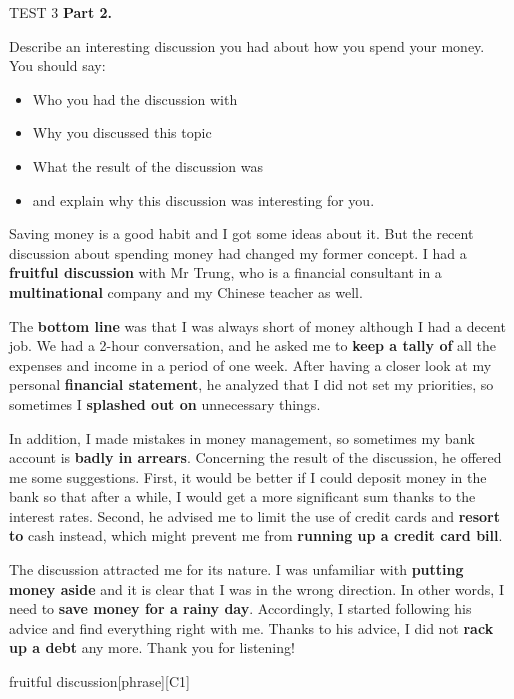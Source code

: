 \begin{glossarymc}[Cambridge 12]
\begin{test}{TEST 3}
    \noindent
    \textbf{Part 2.}
    \begin{qa}{Describe an interesting discussion you had about how you spend your money. You should say:}
    \begin{itemize}
        \item Who you had the discussion with
        \item Why you discussed this topic
        \item What the result of the discussion was
        \item and explain why this discussion was interesting for you.
    \end{itemize}

    Saving money is a good habit and I got some ideas about it. But the recent discussion about spending money had changed my former concept. I had a \textbf{fruitful discussion} with Mr Trung, who is a financial consultant in a \textbf{multinational} company and my Chinese teacher as well.  

    The \textbf{bottom line} was that I was always short of money although I had a decent job. We had a 2-hour conversation, and he asked me to \textbf{keep a tally of} all the expenses and income in a period of one week. After having a closer look at my personal \textbf{financial statement}, he analyzed that I did not set my priorities, so sometimes I \textbf{splashed out on} unnecessary things.  

    In addition, I made mistakes in money management, so sometimes my bank account is \textbf{badly in arrears}. Concerning the result of the discussion, he offered me some suggestions. First, it would be better if I could deposit money in the bank so that after a while, I would get a more significant sum thanks to the interest rates. Second, he advised me to limit the use of credit cards and \textbf{resort to} cash instead, which might prevent me from \textbf{running up a credit card bill}.  

    The discussion attracted me for its nature. I was unfamiliar with \textbf{putting money aside} and it is clear that I was in the wrong direction. In other words, I need to \textbf{save money for a rainy day}. Accordingly, I started following his advice and find everything right with me. Thanks to his advice, I did not \textbf{rack up a debt} any more. Thank you for listening!
    \end{qa}

        \begin{VocabExplain}[Part 2]
            \begin{ExplainCard}{fruitful discussion}[phrase][C1]
            \end{ExplainCard}


\end{VocabExplain}
\end{test}
\end{glossarymc}
